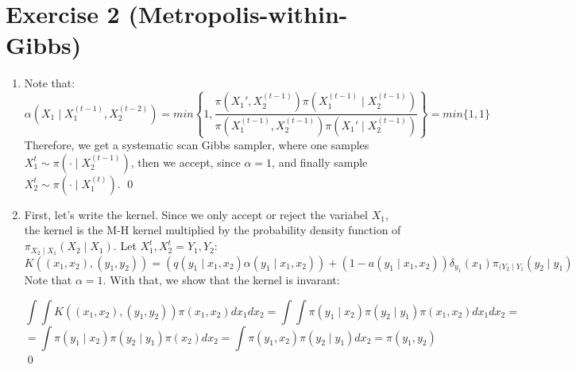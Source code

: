 \documentclass[12pt,letterpaper]{article}
\begin{document}
\section*{Exercise 2 (Metropolis-within-Gibbs)}
\begin{enumerate}[leftmargin=!,labelindent=5pt]
\item Note that:
$$
\alpha(X_1 \mid X_1^{(t-1)}, X_2^{(t-2)}) =
min \left\{
1,
\frac{\pi(X_1' , X_2^{(t-1)})\pi(X_1^{(t-1)}\mid X_2^{(t-1)})}
{\pi(X_1^{(t-1)} , X_2^{(t-1)})\pi(X_1'\mid X_2^{(t-1)})}
\right\} = min \{1, 1\}
$$
Therefore, we get a systematic scan Gibbs sampler, where one
samples $X^t_1 \sim \pi(\cdot \mid X_2^{(t-1)})$, then we accept,
since $\alpha=1$, and finally sample $X_2^t \sim
\pi(\cdot \mid X_1^{(t)})$.
\qed

\item First, let's write the kernel. Since we only accept or reject
the variabel $X_1$, the kernel is the M-H kernel multiplied by the
probability density function of $\pi_{X_2\mid X_1}(X_2\mid X_1)$. Let
$X_1^t, X_2^t = Y_1, Y_2$:
$$
K((x_1,x_2),(y_1, y_2)) =
(q(y_1 \mid x_1, x_2)\alpha(y_1 \mid x_1,x_2)) +
(1 - a(y_1 \mid x_1, x_2))\delta_{y_1}(x_1)\pi_{(Y_2\mid Y_1}(y_2 \mid y_1)
$$
Note that $\alpha = 1$. With that, we show that the kernel is invarant:

$$
\int \int
K((x_1,x_2),(y_1, y_2))\pi(x_1,x_2) dx_1 dx_2 =
\int \int \pi(y_1 \mid x_2)\pi(y_2 \mid y_1) \pi(x_1, x_2)dx_1 dx_2 =
$$
$$=
\int \pi(y_1 \mid x_2) \pi(y_2 \mid y_1) \pi(x_2) dx_2 =
\int \pi(y_1, x_2)\pi(y_2 \mid y_1) dx_2 = \pi(y_1, y_2)
$$
\qed

\end{enumerate}

\newpage
\end{document}
